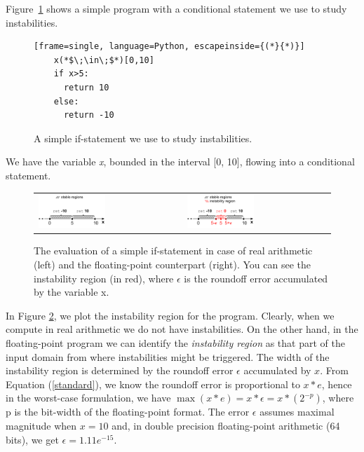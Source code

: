 Figure~\ref{fig:ifstatement} shows a simple program with a conditional statement we use to study instabilities.
%
\begin{figure}[tb!]
	\begin{lstlisting}[frame=single, language=Python, escapeinside={(*}{*)}]
	x(*$\;\in\;$*)[0,10]
	if x>5:
	  return 10
	else:
	  return -10	
	\end{lstlisting}
	\caption{A simple if-statement we use to study instabilities.}\label{fig:ifstatement}
\end{figure}
%
We have the variable \emph{x}, bounded in the interval [0, 10], flowing into a conditional statement.
%
\begin{figure}[tb!]
	\centering
	\begin{tabular}{ll}
		\includegraphics[width=0.48\textwidth]{pic/ifreal.png}
		&
		\includegraphics[width=0.48\textwidth]{pic/iffp.png}
	\end{tabular}
	\caption{The evaluation of a simple if-statement in case of real arithmetic (left) and the floating-point counterpart (right). You can see the instability region (in red), where $\epsilon$ is the roundoff error accumulated by the variable x.}
	\label{fig:ifreal}
\end{figure}
%
In Figure \ref{fig:ifreal}, we plot the instability region for the program. Clearly, when we compute in real arithmetic we do not have instabilities. On the other hand, in the floating-point program we can identify the \emph{instability region} as that part of the input domain from where instabilities might be triggered.
%
The width of the instability region is determined by the roundoff error $\epsilon$ accumulated by $x$. From Equation (\ref{standard}), we know the roundoff error is proportional to $x*e$, hence in the worst-case formulation, we have $\max(x*e) = x*\epsilon = x*(2^{-p})$, where p is the bit-width of the floating-point format. The error $\epsilon$ assumes maximal magnitude when $x=10$ and, in double precision floating-point arithmetic (64 bits), we get $\epsilon=1.11e^{-15}$.
%

